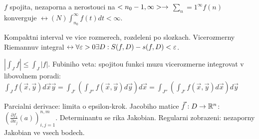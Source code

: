 $f$ spojita, nezaporna a nerostouci na $<n_0-1,\infty> \rightarrow$
$\sum_n=1^\infty f(n)$ konverguje $\leftrightarrow (N)\int_{n_0}^\infty
f(t)dt<\infty$.

Kompaktni interval ve vice rozmerech, rozdeleni po slozkach.
Vicerozmerny Riemannuv integral $\leftrightarrow\forall\varepsilon>0\exists D:
S(f,D)-s(f,D)<\varepsilon$.

$|\int_J f|\leq \int_J |f|$.
Fubiniho veta: spojitou funkci muzu vicerozmerne integrovat v libovolnem
poradi: $\int_J f(\vec{x},\vec{y})
d\vec{x}\vec{y}=\int_{J'}(\int_{J''}f(\vec{x},\vec{y})d\vec{y})d\vec{x}=\int_{J''}(\int_{J'}
f(\vec{x},\vec{y})d\vec{x}) d\vec{y}$

Parcialni derivace: limita o epsilon-krok.
Jacobiho matice $\vec{f}:D\rightarrow\mathbb{R}^n$: $\left(\frac{\partial f_i}{\partial
x_j}(a)\right)^{n,m}_{i,j=1}$. Determinantu se rika Jakobian.
Regularni zobrazeni: nezaporny Jakobian ve vsech bodech.

